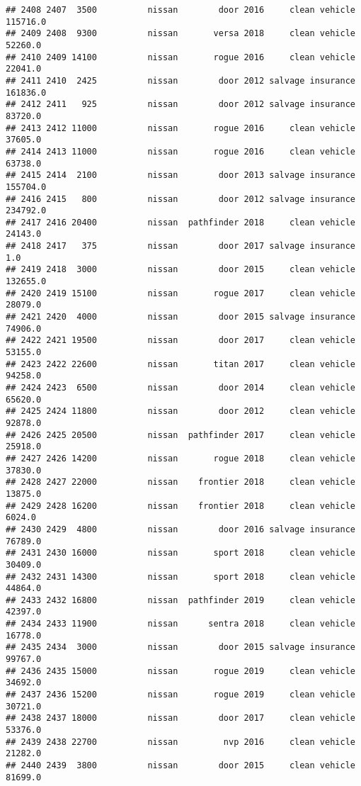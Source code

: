 \documentclass[
]{article}
\begin{document}
\begin{verbatim}
## 2408 2407  3500          nissan        door 2016     clean vehicle  115716.0
## 2409 2408  9300          nissan       versa 2018     clean vehicle   52260.0
## 2410 2409 14100          nissan       rogue 2016     clean vehicle   22041.0
## 2411 2410  2425          nissan        door 2012 salvage insurance  161836.0
## 2412 2411   925          nissan        door 2012 salvage insurance   83720.0
## 2413 2412 11000          nissan       rogue 2016     clean vehicle   37605.0
## 2414 2413 11000          nissan       rogue 2016     clean vehicle   63738.0
## 2415 2414  2100          nissan        door 2013 salvage insurance  155704.0
## 2416 2415   800          nissan        door 2012 salvage insurance  234792.0
## 2417 2416 20400          nissan  pathfinder 2018     clean vehicle   24143.0
## 2418 2417   375          nissan        door 2017 salvage insurance       1.0
## 2419 2418  3000          nissan        door 2015     clean vehicle  132655.0
## 2420 2419 15100          nissan       rogue 2017     clean vehicle   28079.0
## 2421 2420  4000          nissan        door 2015 salvage insurance   74906.0
## 2422 2421 19500          nissan        door 2017     clean vehicle   53155.0
## 2423 2422 22600          nissan       titan 2017     clean vehicle   94258.0
## 2424 2423  6500          nissan        door 2014     clean vehicle   65620.0
## 2425 2424 11800          nissan        door 2012     clean vehicle   92878.0
## 2426 2425 20500          nissan  pathfinder 2017     clean vehicle   25918.0
## 2427 2426 14200          nissan       rogue 2018     clean vehicle   37830.0
## 2428 2427 22000          nissan    frontier 2018     clean vehicle   13875.0
## 2429 2428 16200          nissan    frontier 2018     clean vehicle    6024.0
## 2430 2429  4800          nissan        door 2016 salvage insurance   76789.0
## 2431 2430 16000          nissan       sport 2018     clean vehicle   30409.0
## 2432 2431 14300          nissan       sport 2018     clean vehicle   44864.0
## 2433 2432 16800          nissan  pathfinder 2019     clean vehicle   42397.0
## 2434 2433 11900          nissan      sentra 2018     clean vehicle   16778.0
## 2435 2434  3000          nissan        door 2015 salvage insurance   99767.0
## 2436 2435 15000          nissan       rogue 2019     clean vehicle   34692.0
## 2437 2436 15200          nissan       rogue 2019     clean vehicle   30721.0
## 2438 2437 18000          nissan        door 2017     clean vehicle   53376.0
## 2439 2438 22700          nissan         nvp 2016     clean vehicle   21282.0
## 2440 2439  3800          nissan        door 2015     clean vehicle   81699.0

\end{verbatim}
\end{document}
